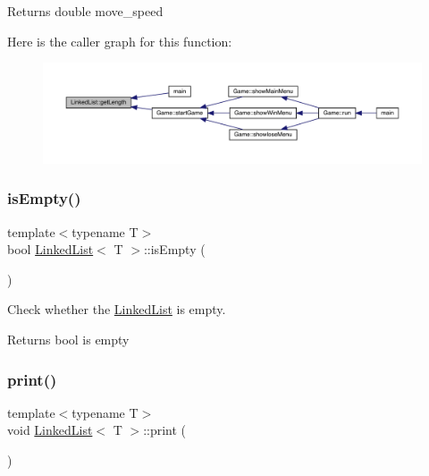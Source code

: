 \begin{DoxyReturn}{Returns}
double move\+\_\+speed 
\end{DoxyReturn}
Here is the caller graph for this function\+:
\nopagebreak
\begin{figure}[H]
\begin{center}
\leavevmode
\includegraphics[width=350pt]{class_linked_list_ac650bde26cf5b3c074e2d59f97e0ff3b_icgraph}
\end{center}
\end{figure}
\mbox{\label{class_linked_list_a7ecbb28e82117a680839ed0dc28ebdce}} 
\subsubsection{\texorpdfstring{is\+Empty()}{isEmpty()}}
{\footnotesize\ttfamily template$<$typename T$>$ \\
bool \mbox{\hyperlink{class_linked_list}{Linked\+List}}$<$ T $>$\+::is\+Empty (\begin{DoxyParamCaption}{ }\end{DoxyParamCaption})\hspace{0.3cm}{\ttfamily [inline]}}



Check whether the \mbox{\hyperlink{class_linked_list}{Linked\+List}} is empty. 

\begin{DoxyReturn}{Returns}
bool is empty 
\end{DoxyReturn}
\mbox{\label{class_linked_list_a9675767b81fb9f1d8799444e4ee7f43b}} 
\subsubsection{\texorpdfstring{print()}{print()}}
{\footnotesize\ttfamily template$<$typename T$>$ \\
void \mbox{\hyperlink{class_linked_list}{Linked\+List}}$<$ T $>$\+::print (\begin{DoxyParamCaption}{ }\end{DoxyParamCaption})\hspace{0.3cm}{\ttfamily [inline]}}



